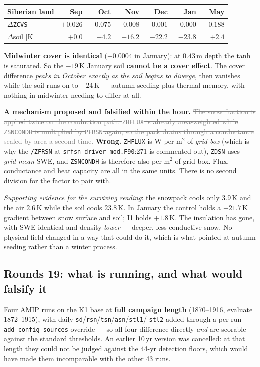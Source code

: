 \documentclass[10pt]{article}
\newcommand{\dead}[1]{\textcolor{gray}{\sout{#1}}}
\begin{document}
\begin{center}\footnotesize
\begin{tabular}{l r r r r r r}
\toprule
Siberian land & Sep & \textbf{Oct} & Nov & Dec & Jan & May \\
\midrule
$\Delta$\texttt{ZCVS} & $+0.026$ & $\mathbf{-0.075}$ & $-0.008$ & $-0.001$ & $-0.000$ & $-0.188$ \\
$\Delta$soil [K] & $+0.0$ & $\mathbf{-4.2}$ & $-16.2$ & $-22.2$ & $-23.8$ & $+2.4$ \\
\bottomrule
\end{tabular}
\end{center}

\noindent \textbf{Midwinter cover is identical} ($-0.0004$ in January): at $0.43$\,m depth
the tanh is saturated. So the $-19$\,K January soil \textbf{cannot be a cover effect}. The
cover difference \emph{peaks in October exactly as the soil begins to diverge}, then vanishes
while the soil runs on to $-24$\,K --- autumn seeding plus thermal memory, with nothing in
midwinter needing to differ at all.

\textbf{A mechanism proposed and falsified within the hour.} \dead{The snow fraction is
applied twice on the conduction path: \texttt{ZHFLUX} is already area-weighted while
\texttt{ZSNCONDH} is multiplied by \texttt{PFRSN} again, so the pack drains through a
conductance scaled by area a second time.} \textbf{Wrong.} \texttt{ZHFLUX} is W per m$^2$ of
\emph{grid box} (which is why the \texttt{/ZFRSN} at
\texttt{srfsn\_driver\_mod.F90}:271 is commented out), \texttt{ZDSN} uses \emph{grid-mean}
SWE, and \texttt{ZSNCONDH} is therefore also per m$^2$ of grid box. Flux, conductance and heat
capacity are all in the same units. There is no second division for the factor to pair with.

\emph{Supporting evidence for the surviving reading}: the snowpack cools only $3.9$\,K and the
air $2.6$\,K while the soil cools $23.8$\,K. In January the control holds a $+21.7$\,K
gradient between snow surface and soil; I1 holds $+1.8$\,K. The insulation has gone, with SWE
identical and density \emph{lower} --- deeper, less conductive snow. No physical field changed
in a way that could do it, which is what pointed at autumn seeding rather than a winter
process.

\subsection{Rounds 19: what is running, and what would falsify it}\label{sub:r19}
Four AMIP runs on the K1 base at \textbf{full campaign length} (1870--1916, evaluate
1872--1915), with daily \texttt{sd}/\texttt{rsn}/\texttt{tsn}/\texttt{asn}/\texttt{stl1}/
\texttt{stl2} added through a per-run \texttt{add\_config\_sources} override --- so all four
difference directly \emph{and} are scorable against the standard thresholds. An earlier
10\,yr version was cancelled: at that length they could not be judged against the 44-yr
detection floors, which would have made them incomparable with the other 43 runs.
\end{document}
